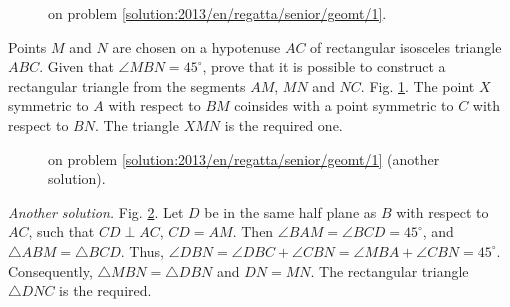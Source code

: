 \ifsolution
\begin{figure}\centering
    \caption{on problem \ref{solution:2013/en/regatta/senior/geomt/1}.}
    \label{fig:solution:2013/en/regatta/senior/geomt/1}
\end{figure}%
\fi %

\problem
Points $M$ and $N$ are chosen on a hypotenuse $AC$ of rectangular isosceles
triangle $ABC$.
Given that $\angle MBN = 45^\circ$, prove that it is possible to construct a
rectangular triangle from the segments $AM$, $MN$ and $NC$.
\solution
\label{solution:2013/en/regatta/senior/geomt/1}%
Fig. \ref{fig:solution:2013/en/regatta/senior/geomt/1}.
The point $X$ symmetric to $A$ with respect to $BM$ coinsides with a point
symmetric to $C$ with respect to $BN$.
The triangle $XMN$ is the required one.
\par
\begin{figure}\centering
    \caption{on problem \ref{solution:2013/en/regatta/senior/geomt/1}
        (another solution).}
    \label{fig:solution:2013/en/regatta/senior/geomt/1/another}
\end{figure}%
\emph{Another solution.}
Fig. \ref{fig:solution:2013/en/regatta/senior/geomt/1/another}.
Let $D$ be in the same half plane as $B$ with respect to $AC$, such that
$CD \perp AC$, $CD = AM$.
Then $\angle BAM = \angle BCD = 45^\circ$, and $\triangle ABM = \triangle BCD$.
Thus,
\(
    \angle DBN = \angle DBC + \angle CBN
=
    \angle MBA + \angle CBN = 45^\circ
\).
Consequently, $\triangle MBN = \triangle DBN$ and $DN = MN$.
The rectangular triangle $\triangle DNC$ is the required.
\endproblem
